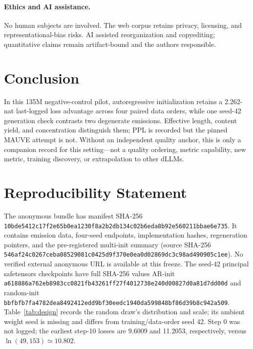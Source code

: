 \documentclass{article}
\newcommand{\shachunks}[8]{\texttt{#1}\allowbreak\texttt{#2}\allowbreak\texttt{#3}\allowbreak\texttt{#4}\allowbreak\texttt{#5}\allowbreak\texttt{#6}\allowbreak\texttt{#7}\allowbreak\texttt{#8}}
\begin{document}
\paragraph{Ethics and AI assistance.}
No human subjects are involved.  The web corpus retains privacy, licensing,
and representational-bias risks.  AI assisted reorganization and copyediting;
quantitative claims remain artifact-bound and the authors responsible.

\section{Conclusion}

In this 135M negative-control pilot, autoregressive initialization retains a
2.262-nat last-logged loss advantage across four paired data orders, while one
seed-42 generation check contrasts two degenerate emissions.  Effective
length, content yield, and concentration distinguish them; PPL is recorded but
the pinned MAUVE attempt is not.  Without an independent quality anchor, this
is only a companion record for this setting---not a quality ordering, metric
capability, new metric, training discovery, or extrapolation to other dLLMs.

\begingroup
\footnotesize
\section*{Reproducibility Statement}
\label{sec:repro}

The anonymous bundle  has manifest SHA-256
\shachunks{10bde541}{2c17f2e6}{5b0ea123}{0f8a2b2d}{b134c02b}{6eda8b92}{e560211b}{bae6e735}.
It contains emission data, four-seed endpoints, implementation hashes,
regeneration pointers, and the pre-registered multi-init summary (source SHA-256
\shachunks{546af24c}{0267ceba}{08529081}{c0425d9f}{370e0ea0}{d02869dc}{3c98ad49}{0905c1ee}).
No verified external anonymous URL is available at this freeze.
The seed-42 principal safetensors checkpoints have full SHA-256 values
AR-init \shachunks{a618886a}{762eb898}{3cc0821f}{b43261ff}{27f40127}{38e240d0}{0827d0a8}{1d7dd00d}
and random-init
\shachunks{bbfbfb7f}{a4782dea}{8492412e}{dd9bf30e}{edc1940d}{a599848b}{f86d39b8}{c942a509}.
Table~\ref{tab:design} records the random draw's distribution and scale; its
ambient weight seed is missing and differs from training/data-order seed 42.
Step 0 was not logged; the earliest step-10 losses are 9.6009 and 11.2053,
respectively, versus $\ln(49{,}153)\simeq10.802$.
\end{document}
